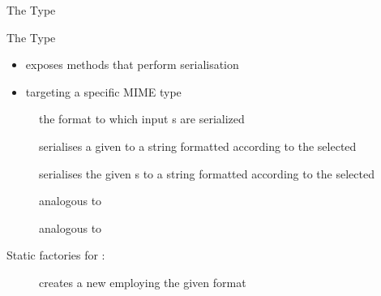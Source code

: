 \documentclass[handout]{beamer}
\begin{document}
\begin{frame}[allowframebreaks]{The  Type}
    
    \begin{block}{The  Type}
        \begin{itemize}
            \item exposes methods that perform  serialisation
            \item targeting a specific MIME type
        \end{itemize}
    \end{block}
    \begin{description}
        \item [] the format to which input s are serialized 
        \item [] serialises a given  to a string formatted according to the selected 
        \item [] serialises the given s to a string formatted according to the selected 
        \item [] analogous to 
        \item [] analogous to 
    \end{description}

    \framebreak

    Static factories for :
    \begin{description}
        \item [] creates a new  employing the given format
    \end{description}

\end{frame}
\end{document}
